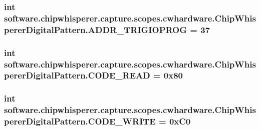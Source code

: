 \subsubsection[{A\+D\+D\+R\+\_\+\+T\+R\+I\+G\+I\+O\+P\+R\+O\+G}]{\setlength{\rightskip}{0pt plus 5cm}int software.\+chipwhisperer.\+capture.\+scopes.\+cwhardware.\+Chip\+Whisperer\+Digital\+Pattern.\+A\+D\+D\+R\+\_\+\+T\+R\+I\+G\+I\+O\+P\+R\+O\+G = 37}\label{namespacesoftware_1_1chipwhisperer_1_1capture_1_1scopes_1_1cwhardware_1_1ChipWhispererDigitalPattern_a62095de9666a46eb089d5880b80298c7}
\hypertarget{namespacesoftware_1_1chipwhisperer_1_1capture_1_1scopes_1_1cwhardware_1_1ChipWhispererDigitalPattern_a9a98491d18062d5c263554edc8b5b8be}{}
\subsubsection[{C\+O\+D\+E\+\_\+\+R\+E\+A\+D}]{\setlength{\rightskip}{0pt plus 5cm}int software.\+chipwhisperer.\+capture.\+scopes.\+cwhardware.\+Chip\+Whisperer\+Digital\+Pattern.\+C\+O\+D\+E\+\_\+\+R\+E\+A\+D = 0x80}\label{namespacesoftware_1_1chipwhisperer_1_1capture_1_1scopes_1_1cwhardware_1_1ChipWhispererDigitalPattern_a9a98491d18062d5c263554edc8b5b8be}
\hypertarget{namespacesoftware_1_1chipwhisperer_1_1capture_1_1scopes_1_1cwhardware_1_1ChipWhispererDigitalPattern_afb845e3dfa258a8b6000026d8ad8aced}{}
\subsubsection[{C\+O\+D\+E\+\_\+\+W\+R\+I\+T\+E}]{\setlength{\rightskip}{0pt plus 5cm}int software.\+chipwhisperer.\+capture.\+scopes.\+cwhardware.\+Chip\+Whisperer\+Digital\+Pattern.\+C\+O\+D\+E\+\_\+\+W\+R\+I\+T\+E = 0x\+C0}\label{namespacesoftware_1_1chipwhisperer_1_1capture_1_1scopes_1_1cwhardware_1_1ChipWhispererDigitalPattern_afb845e3dfa258a8b6000026d8ad8aced}
